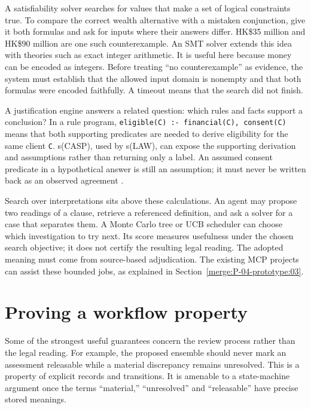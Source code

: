 A satisfiability solver searches for values that make a set of logical
constraints true. To compare the correct wealth alternative with a mistaken
conjunction, give it both formulas and ask for inputs where their answers differ.
HK\$35 million and HK\$90 million are one such counterexample. An SMT solver
extends this idea with theories such as exact integer arithmetic. It is useful
here because money can be encoded as integers. Before treating ``no
counterexample'' as evidence, the system must establish that the allowed input
domain is nonempty and that both formulas were encoded faithfully. A timeout
means that the search did not finish.


A justification engine answers a related question: which rules and facts support
a conclusion? In a rule program, \texttt{eligible(C) :- financial(C), consent(C)}
means that both supporting predicates are needed to derive eligibility for the
same client \texttt{C}. s(CASP), used by s(LAW), can expose the supporting
derivation and assumptions rather than returning only a label. An assumed
consent predicate in a hypothetical answer is still an assumption; it must never
be written back as an observed agreement \citep{slaw2024}.

Search over interpretations sits above these calculations. An agent may propose
two readings of a clause, retrieve a referenced definition, and ask a solver for
a case that separates them. A Monte Carlo tree or UCB scheduler can choose which
investigation to try next. Its score measures usefulness under the chosen search
objective; it does not certify the resulting legal reading. The adopted meaning
must come from source-based adjudication. The existing MCP projects can assist
these bounded jobs, as explained in Section~\ref{merge:P-04-prototype:03}.

\section{Proving a workflow property}
\label{merge:M03:10}

\label{sec:proof-workflow}
Some of the strongest useful guarantees concern the review process rather than
the legal reading. For example, the proposed ensemble should never mark an
assessment releasable while a material discrepancy remains unresolved. This is
a property of explicit records and transitions. It is amenable to a state-machine
argument once the terms ``material,'' ``unresolved'' and ``releasable'' have
precise stored meanings.

